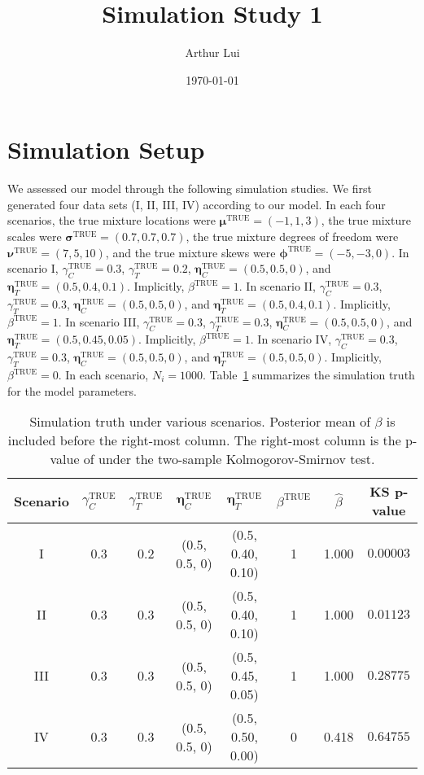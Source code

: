 \documentclass[12pt]{article} %
\title{Simulation Study 1}
\author{Arthur Lui}
\date{\today} %
\newcommand{\true}{\text{TRUE}}
\begin{document}
\maketitle

\section{Simulation Setup}\label{sec:sim-setup}
We assessed our model through the following simulation studies. We first
generated four data sets (I, II, III, IV) according to our model. In each
four scenarios,
%
the true mixture locations were $\bm{\mu}^\true=(-1, 1, 3)$,
the true mixture scales were $\bm{\sigma}^\true=(0.7, 0.7, 0.7)$,
the true mixture degrees of freedom were $\bm{\nu}^\true=(7, 5, 10)$, and
the true mixture skews were $\bm{\phi}^\true=(-5, -3, 0)$.
%
In scenario I, $\gamma_C^\true=0.3$, $\gamma_T^\true=0.2$, $\bm\eta_C^\true=(0.5,
0.5, 0)$, and $\bm\eta_T^\true=(0.5,0.4,0.1)$. Implicitly, $\beta^\true=1$.
In scenario II, $\gamma_C^\true=0.3$, $\gamma_T^\true=0.3$, $\bm\eta_C^\true=(0.5,
0.5, 0)$, and $\bm\eta_T^\true=(0.5,0.4,0.1)$. Implicitly, $\beta^\true=1$.
In scenario III, $\gamma_C^\true=0.3$, $\gamma_T^\true=0.3$, $\bm\eta_C^\true=(0.5,
0.5, 0)$, and $\bm\eta_T^\true=(0.5,0.45,0.05)$. Implicitly, $\beta^\true=1$.
In scenario IV, $\gamma_C^\true=0.3$, $\gamma_T^\true=0.3$, $\bm\eta_C^\true=(0.5,
0.5, 0)$, and $\bm\eta_T^\true=(0.5,0.5,0)$. Implicitly, $\beta^\true=0$.
%
In each scenario, $N_i=1000$. Table~\ref{tab:sim-truth} summarizes the
simulation truth for the model parameters.
\begin{table}
  \centering
  \begin{tabular}{|c|ccccccc|}
    \hline 
    Scenario & $\gamma_C^\true$ & $\gamma_T^\true$ & $\bm\eta_C^\true$ & 
    $\bm\eta_T^\true$ & $\beta^\true$ & $\hat\beta$ & KS p-value \\
    \hline 
    I   & 0.3 & 0.2 & (0.5, 0.5, 0) & (0.5, 0.40, 0.10) & 1 & 1.000 & $0.00003$ \\
    II  & 0.3 & 0.3 & (0.5, 0.5, 0) & (0.5, 0.40, 0.10) & 1 & 1.000 & $0.01123$ \\
    III & 0.3 & 0.3 & (0.5, 0.5, 0) & (0.5, 0.45, 0.05) & 1 & 1.000 & $0.28775$ \\
    IV  & 0.3 & 0.3 & (0.5, 0.5, 0) & (0.5, 0.50, 0.00) & 0 & 0.418 & $0.64755$ \\
    \hline
  \end{tabular}
  \caption{Simulation truth under various scenarios. Posterior mean of
  $\beta$ is included before the right-most column. The right-most column
  is the p-value of under the two-sample Kolmogorov-Smirnov test.}
  \label{tab:sim-truth}
\end{table}
\end{document}
